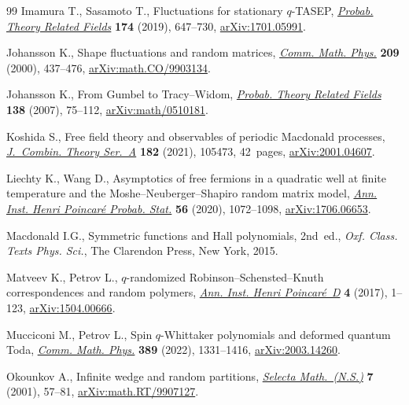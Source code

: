 \documentclass[pdftex]{sigma}
\numberwithin{equation}{section}
\begin{document}
\begin{thebibliography}{99}
Imamura T., Sasamoto T., Fluctuations for stationary {$q$}-{TASEP},
 \href{https://doi.org/10.1007/s00440-018-0868-3}{\textit{Probab. Theory Related Fields}} \textbf{174} (2019), 647--730,
 \href{https://arxiv.org/abs/1701.05991}{arXiv:1701.05991}.

Johansson K., Shape fluctuations and random matrices, \href{https://doi.org/10.1007/s002200050027}{\textit{Comm. Math.
 Phys.}} \textbf{209} (2000), 437--476, \href{https://arxiv.org/abs/math.CO/9903134}{arXiv:math.CO/9903134}.

Johansson K., From {G}umbel to {T}racy--{W}idom, \href{https://doi.org/10.1007/s00440-006-0012-7}{\textit{Probab. Theory Related
 Fields}} \textbf{138} (2007), 75--112, \href{https://arxiv.org/abs/math/0510181}{arXiv:math/0510181}.

Koshida S., Free field theory and observables of periodic {M}acdonald
 processes, \href{https://doi.org/10.1016/j.jcta.2021.105473}{\textit{J.~Combin. Theory Ser.~A}} \textbf{182} (2021), 105473,
 42~pages, \href{https://arxiv.org/abs/2001.04607}{arXiv:2001.04607}.

Liechty K., Wang D., Asymptotics of free fermions in a quadratic well at finite
 temperature and the {M}oshe--{N}euberger--{S}hapiro random matrix model,
 \href{https://doi.org/10.1214/19-AIHP994}{\textit{Ann. Inst. Henri Poincar\'e Probab. Stat.}} \textbf{56} (2020),
 1072--1098, \href{https://arxiv.org/abs/1706.06653}{arXiv:1706.06653}.

Macdonald I.G., Symmetric functions and {H}all polynomials, 2nd~ed., \textit{Oxf.
 Class. Texts Phys. Sci.}, The Clarendon Press, New York, 2015.

Matveev K., Petrov L., {$q$}-randomized {R}obinson--{S}chensted--{K}nuth
 correspondences and random polymers, \href{https://doi.org/10.4171/AIHPD/36}{\textit{Ann. Inst. Henri Poincar\'e~D}}
 \textbf{4} (2017), 1--123, \href{https://arxiv.org/abs/1504.00666}{arXiv:1504.00666}.

Mucciconi M., Petrov L., Spin {$q$}-{W}hittaker polynomials and deformed
 quantum {T}oda, \href{https://doi.org/10.1007/s00220-021-04279-5}{\textit{Comm. Math. Phys.}} \textbf{389} (2022), 1331--1416,
 \href{https://arxiv.org/abs/2003.14260}{arXiv:2003.14260}.

Okounkov A., Infinite wedge and random partitions, \href{https://doi.org/10.1007/PL00001398}{\textit{Selecta
 Math.~(N.S.)}} \textbf{7} (2001), 57--81, \href{https://arxiv.org/abs/math.RT/9907127}{arXiv:math.RT/9907127}.


\end{thebibliography}
\end{document}
